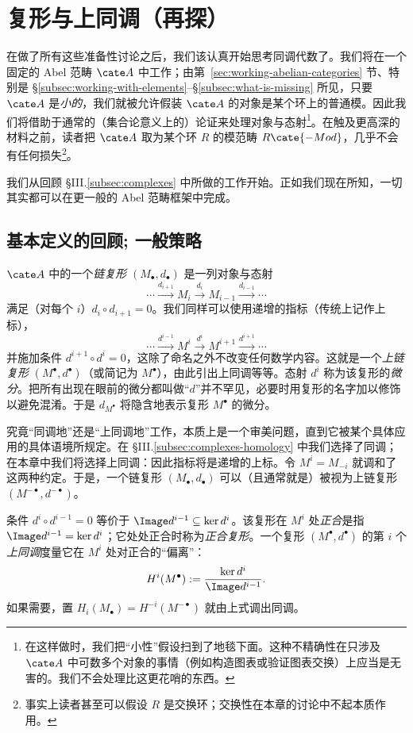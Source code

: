 \section{复形与上同调（再探）}
\label{sec:complexes-homology-again}

在做了所有这些准备性讨论之后，我们该认真开始思考同调代数了。我们将在一个固定的 Abel 范畴 $\cate A$ 中工作；由第~\ref{sec:working-abelian-categories} 节、特别是 \S\ref{subsec:working-with-elements}--\S\ref{subsec:what-is-missing} 所见，只要 $\cate A$ 是\emph{小的}，我们就被允许假装 $\cate A$ 的对象是某个环上的普通模。因此我们将借助于通常的（集合论意义上的）论证来处理对象与态射\footnote{在这样做时，我们把“小性”假设扫到了地毯下面。这种不精确性在只涉及 $\cate A$ 中可数多个对象的事情（例如构造图表或验证图表交换）上应当是无害的。我们不会处理比这更花哨的东西。}。在触及更高深的材料之前，读者把 $\cate A$ 取为某个环 $R$ 的模范畴 $R\cate{-Mod}$，几乎不会有任何损失\footnote{事实上读者甚至可以假设 $R$ 是交换环；交换性在本章的讨论中不起本质作用。}。

我们从回顾 §III.\ref{subsec:complexes} 中所做的工作开始。正如我们现在所知，一切其实都可以在更一般的 Abel 范畴框架中完成。

\subsection{基本定义的回顾; 一般策略}
\label{subsec:3.1-basic}

$\cate A$ 中的一个\emph{链复形} $(M_\bullet, d_\bullet)$ 是一列对象与态射
\[
\cdots \xrightarrow{d_{i+1}} M_i \xrightarrow{d_i} M_{i-1} \xrightarrow{d_{i-1}} \cdots
\]
满足（对每个 $i$）$d_i\circ d_{i+1}=0$。我们同样可以使用递增的指标（传统上记作上标），
\[
\cdots \xrightarrow{d^{i-1}} M^i \xrightarrow{d^i} M^{i+1} \xrightarrow{d^{i+1}} \cdots
\]
并施加条件 $d^{i+1}\circ d^i=0$，这除了命名之外不改变任何数学内容。这就是一个\emph{上链复形} $(M^\bullet, d^\bullet)$（或简记为 $M^\bullet$），由此引出上同调等等。态射 $d^i$ 称为该复形的\emph{微分}。把所有出现在眼前的微分都叫做“$d$”并不罕见，必要时用复形的名字加以修饰以避免混淆。于是 $d_{M^\bullet}$ 将隐含地表示复形 $M^\bullet$ 的微分。

究竟“同调地”还是“上同调地”工作，本质上是一个审美问题，直到它被某个具体应用的具体语境所规定。在 §III.\ref{subsec:complexes-homology} 中我们选择了同调；在本章中我们将选择上同调：因此指标将是递增的上标。令 $M^i=M_{-i}$ 就调和了这两种约定。于是，一个链复形 $(M_\bullet, d_\bullet)$ 可以（且通常就是）被视为上链复形 $(M^{-\bullet}, d^{-\bullet})$。

条件 $d^i\circ d^{i-1}=0$ 等价于 $\Image d^{i-1}\subseteq\ker d^{i}$。该复形在 $M^i$ 处\emph{正合}是指 $\Image d^{i-1}=\ker d^{i}$；它处处正合时称为\emph{正合复形}。一个复形 $(M^\bullet, d^\bullet)$ 的第 $i$ 个\emph{上同调}度量它在 $M^i$ 处对正合的“偏离”：
\[
H^i(M^\bullet) := \frac{\ker d^i}{\Image d^{i-1}}.
\]
如果需要，置 $H_i(M_\bullet)=H^{-i}(M^{-\bullet})$ 就由上式调出同调。

